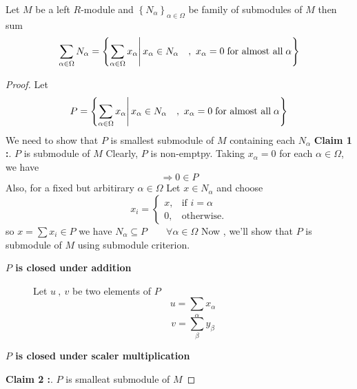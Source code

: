   \begin{prop}
    Let $M$ be a left $R$-module and $\left\lbrace N_\alpha\right\rbrace_{\alpha \in \Omega }$  be family of submodules of $M$ then sum \[\sum\limits_{\alpha \in \Omega } N_\alpha =\left\lbrace \sum\limits_{\alpha \in \Omega } x_\alpha \middle\vert\, x_\alpha \in N_\alpha \quad ,\  x_\alpha = 0 \; \textmd{for almost all} \; \alpha  \right\rbrace \] 
    \begin{proof}
      Let \[P = \left\lbrace \sum\limits_{\alpha \in \Omega } x_\alpha \middle\vert\, x_\alpha \in N_\alpha \quad , \ x_\alpha = 0 \; \textmd{for almost all} \; \alpha\right\rbrace \]
      We need to show that $P$ is smallest submodule of $M$ containing each $N_\alpha$
      \newline  \bigskip
      \textbf{Claim 1 :}.  \qquad $P$ is submodule of $M$  \newline Clearly, $P$ is non-emptpy. Taking $x_\alpha = 0$ for each $\alpha \in \Omega$, we have \[\Rightarrow0 \in P\] Also, for a fixed but arbitirary $\alpha \in \Omega $ \newline Let $x\in N_\alpha$ and  choose \[ x_i = \begin{cases}
                                 x, & \mbox{if } i =\alpha \\
                                 0, & \mbox{otherwise}.
                               \end{cases}\]
            so $x =\sum x_i \in P$  we have $N_\alpha \subseteq P \qquad \forall \alpha \in \Omega$ 
      \newline  \bigskip
      Now , we'll show that $P$ is submodule of $M$ using submodule criterion.\newline
      \begin{description}
        \item[\textbf{$P$ is closed under addition}]   Let $u\ , \ v$ be two elements of $P$
        \[u = \sum_{\alpha} x_\alpha \] 
        \[v = \sum_{\beta} y_\beta \] 
        \item[\textbf{$P$ is closed under scaler multiplication}]
      \end{description}
      \textbf{Claim 2 :}.  \qquad $P$ is smalleat submodule of $M$  \newline
       \end{proof}


     \end{prop} 